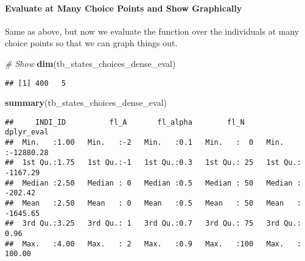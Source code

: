 \documentclass[
]{book}
\newenvironment{Shaded}{\begin{snugshade}}{\end{snugshade}}
\newcommand{\CommentTok}[1]{\textcolor[rgb]{0.56,0.35,0.01}{\textit{#1}}}
\newcommand{\DataTypeTok}[1]{\textcolor[rgb]{0.13,0.29,0.53}{#1}}
\newcommand{\KeywordTok}[1]{\textcolor[rgb]{0.13,0.29,0.53}{\textbf{#1}}}
\newcommand{\NormalTok}[1]{#1}
\newcommand{\OperatorTok}[1]{\textcolor[rgb]{0.81,0.36,0.00}{\textbf{#1}}}
\newcommand{\StringTok}[1]{\textcolor[rgb]{0.31,0.60,0.02}{#1}}
\begin{document}
\hypertarget{evaluate-at-many-choice-points-and-show-graphically}{%
\paragraph{Evaluate at Many Choice Points and Show Graphically}\label{evaluate-at-many-choice-points-and-show-graphically}}

Same as above, but now we evaluate the function over the individuals at many choice points so that we can graph things out.

\begin{Shaded}
\end{Shaded}

\begin{Shaded}
\begin{Highlighting}[]
\CommentTok{# Show}
\KeywordTok{dim}\NormalTok{(tb_states_choices_dense_eval)}
\end{Highlighting}
\end{Shaded}

\begin{verbatim}
## [1] 400   5
\end{verbatim}

\begin{Shaded}
\begin{Highlighting}[]
\KeywordTok{summary}\NormalTok{(tb_states_choices_dense_eval)}
\end{Highlighting}
\end{Shaded}

\begin{verbatim}
##     INDI_ID          fl_A       fl_alpha        fl_N       dplyr_eval       
##  Min.   :1.00   Min.   :-2   Min.   :0.1   Min.   :  0   Min.   :-12880.28  
##  1st Qu.:1.75   1st Qu.:-1   1st Qu.:0.3   1st Qu.: 25   1st Qu.: -1167.29  
##  Median :2.50   Median : 0   Median :0.5   Median : 50   Median :  -202.42  
##  Mean   :2.50   Mean   : 0   Mean   :0.5   Mean   : 50   Mean   : -1645.65  
##  3rd Qu.:3.25   3rd Qu.: 1   3rd Qu.:0.7   3rd Qu.: 75   3rd Qu.:     0.96  
##  Max.   :4.00   Max.   : 2   Max.   :0.9   Max.   :100   Max.   :   100.00
\end{verbatim}
\end{document}
